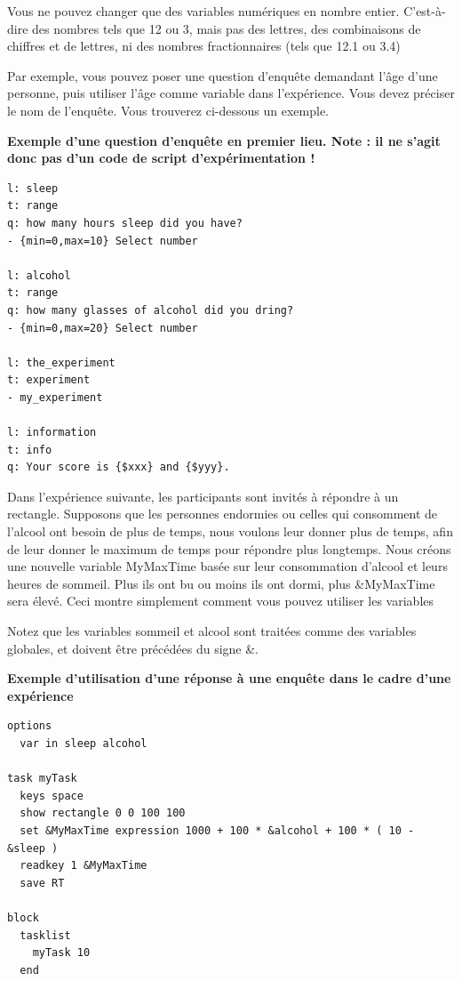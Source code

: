 \documentclass[
]{book}
\begin{document}
Vous ne pouvez changer que des variables numériques en nombre entier. C'est-à-dire des nombres tels que 12 ou 3, mais pas des lettres, des combinaisons de chiffres et de lettres, ni des nombres fractionnaires (tels que 12.1 ou 3.4)

Par exemple, vous pouvez poser une question d'enquête demandant l'âge d'une personne, puis utiliser l'âge comme variable dans l'expérience. Vous devez préciser le nom de l'enquête. Vous trouverez ci-dessous un exemple.

\textbf{Exemple d'une question d'enquête en premier lieu. Note : il ne s'agit donc pas d'un code de script d'expérimentation !}

\begin{verbatim}
l: sleep
t: range
q: how many hours sleep did you have?
- {min=0,max=10} Select number

l: alcohol
t: range
q: how many glasses of alcohol did you dring?
- {min=0,max=20} Select number

l: the_experiment
t: experiment
- my_experiment

l: information
t: info
q: Your score is {$xxx} and {$yyy}.
\end{verbatim}

Dans l'expérience suivante, les participants sont invités à répondre à un rectangle. Supposons que les personnes endormies ou celles qui consomment de l'alcool ont besoin de plus de temps, nous voulons leur donner plus de temps, afin de leur donner le maximum de temps pour répondre plus longtemps. Nous créons une nouvelle variable MyMaxTime basée sur leur consommation d'alcool et leurs heures de sommeil. Plus ils ont bu ou moins ils ont dormi, plus \&MyMaxTime sera élevé. Ceci montre simplement comment vous pouvez utiliser les variables

Notez que les variables sommeil et alcool sont traitées comme des variables globales, et doivent être précédées du signe \&.

\textbf{Exemple d'utilisation d'une réponse à une enquête dans le cadre d'une expérience}

\begin{verbatim}
options
  var in sleep alcohol

task myTask
  keys space
  show rectangle 0 0 100 100
  set &MyMaxTime expression 1000 + 100 * &alcohol + 100 * ( 10 - &sleep )
  readkey 1 &MyMaxTime
  save RT

block
  tasklist
    myTask 10
  end
\end{verbatim}
\end{document}
